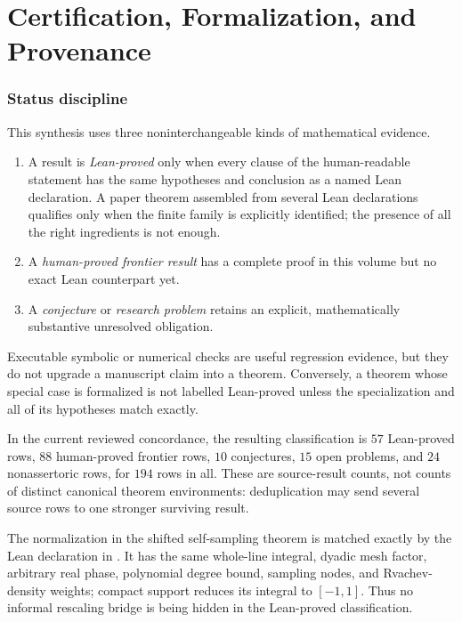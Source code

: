 \part{Certification, Formalization, and Provenance}

\section{Status discipline}
\label{sec:status-discipline}

This synthesis uses three noninterchangeable kinds of mathematical evidence.

\begin{enumerate}
\item A result is \emph{Lean-proved} only when every clause of the
      human-readable statement has the same hypotheses and conclusion as a
      named Lean declaration.  A paper theorem assembled from several Lean
      declarations qualifies only when the finite family is explicitly
      identified; the presence of all the right ingredients is not enough.
\item A \emph{human-proved frontier result} has a complete proof in this volume
      but no exact Lean counterpart yet.
\item A \emph{conjecture} or \emph{research problem} retains an explicit,
      mathematically substantive unresolved obligation.
\end{enumerate}

Executable symbolic or numerical checks are useful regression evidence, but
they do not upgrade a manuscript claim into a theorem.  Conversely, a theorem
whose special case is formalized is not labelled Lean-proved unless the
specialization and all of its hypotheses match exactly.

In the current reviewed concordance, the resulting classification is
\(57\) Lean-proved rows, \(88\) human-proved frontier
rows, \(10\) conjectures, \(15\) open problems, and \(24\) nonassertoric
rows, for \(194\) rows in all.  These are source-result counts, not counts of
distinct canonical theorem environments: deduplication may send several
source rows to one stronger surviving result.

The normalization in the shifted self-sampling theorem is matched exactly by
the Lean declaration
in .  It has the same
whole-line integral, dyadic mesh factor, arbitrary real phase, polynomial
degree bound, sampling nodes, and Rvachev-density weights; compact support
reduces its integral to \([-1,1]\).  Thus no informal rescaling bridge is
being hidden in the Lean-proved classification.

